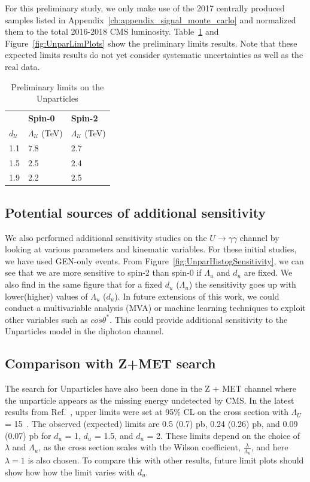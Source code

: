 For this preliminary study, we only make use of the 2017 centrally produced samples listed in Appendix~\ref{ch:appendix_signal_monte_carlo} and normalized them to the total 2016-2018 CMS luminosity. Table~\ref{tab:UnparLimitsPrelim} and Figure~\ref{fig:UnparLimPlots} show the preliminary limits results. Note that these expected limits results do not yet consider systematic uncertainties as well as the real data. 

\begin{table}[!htbp]
  \centering
  \caption{Preliminary limits on the Unparticles}
  \begin{tabular}{lll}
     & \textbf{Spin-0} & \textbf{Spin-2} \\
    $d_{\mathcal{U}}$ & $\Lambda_{\mathcal{U}}$ (TeV) & $\Lambda_{\mathcal{U}}$ (TeV) \\
    \hline
    1.1 & 7.8 & 2.7 \\
    1.5 & 2.5 & 2.4 \\
    1.9 & 2.2 & 2.5 \\
    \hline 
  \end{tabular}
  \label{tab:UnparLimitsPrelim}
\end{table}

\subsection{Potential sources of additional sensitivity}

We also performed additional sensitivity studies on the $U\rightarrow \gamma\gamma$ channel by looking at various parameters and kinematic variables. For these initial studies, we have used GEN-only events. From Figure~\ref{fig:UnparHistogSensitivity}, we can see that we are more sensitive to spin-2 than spin-0 if $\Lambda_u$ and $d_{u}$ are fixed.  
We also find in the same figure that for a fixed $d_{u}$ ($\Lambda_{u}$) the sensitivity goes up with lower(higher) values of $\Lambda_{u}$ ($d_{u}$). In future extensions of this work, we could conduct a multivariable analysis (MVA) or machine learning techniques to exploit other variables such as $cos\theta^*$. This could provide additional sensitivity to the Unparticles model in the diphoton channel.

\subsection{Comparison with Z+MET search}

The search for Unparticles have also been done in the Z + MET channel where the unparticle appears as the missing energy undetected by CMS. In the latest results from Ref.~\cite{CMS:2020ulv}, upper limits were set at 95\% CL on the cross section with $\Lambda_U$ = 15~\TeV. The observed (expected) limits are 0.5 (0.7) pb, 0.24
(0.26) pb, and 0.09 (0.07) pb for $d_u$ = 1, $d_u$ = 1.5, and $d_u$ = 2. These limits depend on the choice of $\lambda$ and $\Lambda_{u}$, as the cross section scales with the Wilson coefficient, $\frac{\lambda}{\Lambda_{u}}$, and here $\lambda =1$ is also chosen. To compare this with other results, future limit plots should show how how the limit varies with $d_u$. 

